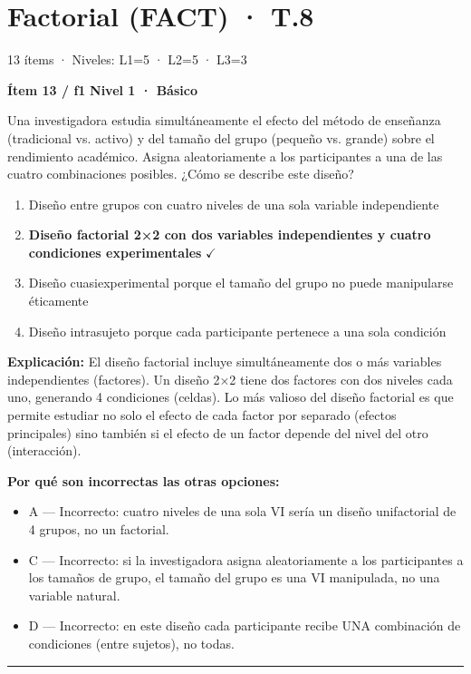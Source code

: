 \documentclass[12pt,a4paper]{article}
\begin{document}
\section{Factorial (FACT) · T.8}
{\small\color{gris} 13 ítems · Niveles: L1=5 · L2=5 · L3=3}

\begin{mdframed}[backgroundcolor=fondogris,linecolor=azul,linewidth=1pt,innerleftmargin=10pt,innerrightmargin=10pt,innertopmargin=7pt,innerbottommargin=7pt]
\textbf{Ítem 13 / f1} \hfill {\small\bfseries\color{azul} Nivel 1 · Básico}
\end{mdframed}

Una investigadora estudia simultáneamente el efecto del método de enseñanza (tradicional vs. activo) y del tamaño del grupo (pequeño vs. grande) sobre el rendimiento académico. Asigna aleatoriamente a los participantes a una de las cuatro combinaciones posibles. ¿Cómo se describe este diseño?

\begin{enumerate}
  \item[A.] Diseño entre grupos con cuatro niveles de una sola variable independiente
  \item[\textbf{\color{verde}B.}] \textbf{\color{verde} Diseño factorial 2×2 con dos variables independientes y cuatro condiciones experimentales} \hfill $\checkmark$
  \item[C.] Diseño cuasiexperimental porque el tamaño del grupo no puede manipularse éticamente
  \item[D.] Diseño intrasujeto porque cada participante pertenece a una sola condición
\end{enumerate}

\noindent\textbf{\color{azul}Explicación:} El diseño factorial incluye simultáneamente dos o más variables independientes (factores). Un diseño 2×2 tiene dos factores con dos niveles cada uno, generando 4 condiciones (celdas). Lo más valioso del diseño factorial es que permite estudiar no solo el efecto de cada factor por separado (efectos principales) sino también si el efecto de un factor depende del nivel del otro (interacción).

\noindent\textbf{\color{gris}Por qué son incorrectas las otras opciones:}
\begin{itemize}
  \item {\small A — Incorrecto: cuatro niveles de una sola VI sería un diseño unifactorial de 4 grupos, no un factorial.}
  \item {\small C — Incorrecto: si la investigadora asigna aleatoriamente a los participantes a los tamaños de grupo, el tamaño del grupo es una VI manipulada, no una variable natural.}
  \item {\small D — Incorrecto: en este diseño cada participante recibe UNA combinación de condiciones (entre sujetos), no todas.}
\end{itemize}
\vspace{8pt}\hrule\vspace{10pt}
\end{document}
